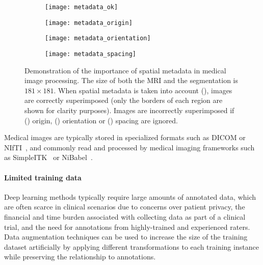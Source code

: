 \begin{figure}
  \centering

  \begin{subfigure}{0.24\textwidth}
    \texttt{[image: metadata\_ok]}
    \caption{}
    \label{fig:meta_ok}
  \end{subfigure}
  \hfill
  \begin{subfigure}{0.24\textwidth}
    \texttt{[image: metadata\_origin]}
    \caption{}
    \label{fig:meta_origin}
  \end{subfigure}
  \hfill
  \begin{subfigure}{0.24\textwidth}
    \texttt{[image: metadata\_orientation]}
    \caption{}
    \label{fig:meta_orientation}
  \end{subfigure}
  \hfill
  \begin{subfigure}{0.24\textwidth}
    \texttt{[image: metadata\_spacing]}
    \caption{}
    \label{fig:meta_spacing}
  \end{subfigure}

  \caption[Importance of spatial metadata in medical imaging processing]{
    Demonstration of the importance of spatial metadata in medical image processing.
    The size of both the \ac{MRI} and the segmentation is $181 \times 181$.
    When spatial metadata is taken into account (), images are correctly superimposed (only the borders of each region are shown for clarity purposes).
    Images are incorrectly superimposed if () origin, () orientation or () spacing are ignored.
  }
  \label{fig:metadata}
\end{figure}



Medical images are typically stored in specialized formats such as \ac{DICOM} or \ac{NIfTI}~\cite{larobina_medical_2014}, and commonly read and processed by medical imaging frameworks
such as SimpleITK~\cite{lowekamp_design_2013} or NiBabel~\cite{brett_nipynibabel_2020}.


\paragraph{Limited training data}

Deep learning methods typically require large amounts of annotated data, which are often scarce in clinical scenarios due to concerns over patient privacy, the financial and time burden associated with collecting data as part of a clinical trial, and the need for annotations from highly-trained and experienced raters.
Data augmentation techniques can be used to increase the size of the training dataset artificially by applying different transformations to each training instance while preserving the relationship to annotations.

